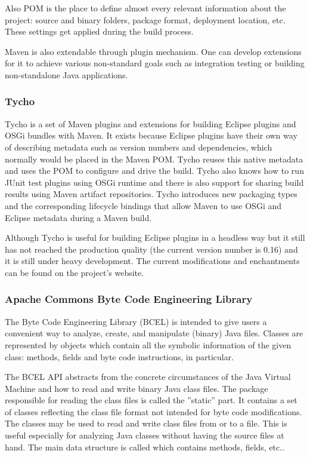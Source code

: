Also POM is the place to define almost every relevant information about the project:
source and binary folders, package format, deployment location, etc. These settings
get applied during the build process.

Maven is also extendable through plugin mechanism. One can develop extensions for it
to achieve various non-standard goals such as integration testing or building 
non-standalone Java applications.

\subsubsection{Tycho~\cite{TychoWeb}}
Tycho is a set of Maven plugins and extensions for building Eclipse plugins and
OSGi bundles with Maven. It exists because Eclipse plugins have their own way of
describing metadata such as version numbers and dependencies, which normally
would be placed in the Maven POM. Tycho reuses this native metadata 
and uses the POM to configure and drive the build. Tycho also knows
how to run JUnit test plugins using OSGi runtime and there is also support for
sharing build results using Maven artifact repositories. Tycho introduces
new packaging types and the corresponding lifecycle bindings that allow Maven to
use OSGi and Eclipse metadata during a Maven build.

Although Tycho is useful for building Eclipse plugins in a headless way but it
still has not reached the production quality (the current version number is
0.16) and it is still under heavy development. The current modifications and
enchantments can be found on the project's website.

\subsubsection{Apache Commons Byte Code Engineering Library~\cite{BCEL}} 
The Byte Code Engineering Library (BCEL) is intended to give users a
convenient way to analyze, create, and manipulate (binary) Java files. Classes
are represented by objects which contain all the symbolic information of the
given class: methods, fields and byte code instructions, in particular.

The BCEL API abstracts from the concrete circumstances of the Java Virtual
Machine and how to read and write binary Java class files. The package 
responsible for reading the class files is called the ''static'' part.
It contains a set of classes reflecting the class file format not intended for
byte code modifications. The classes may be used to read and write class files
from or to a file. This is useful especially for analyzing Java classes without
having the source files at hand. The main data structure is called
 which contains methods, fields, etc..


